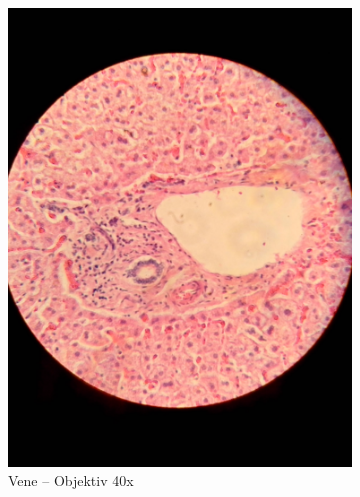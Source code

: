 \begin{figure}[h!]
	\begin{subfigure}[b]{0.3\textwidth}
		\includegraphics[width=1\textwidth]{../images/07_human_liver.jpg}
		\caption{Vene -- Objektiv 40x}
	\end{subfigure}
	\begin{subfigure}[b]{0.3\textwidth}

\end{subfigure}
\end{figure}
